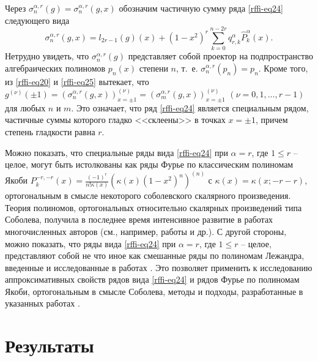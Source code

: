 Через $\sigma_n^{\alpha,r}(g)=\sigma_n^{\alpha,r}(g,x)$ обозначим частичную сумму ряда \eqref{rffi-eq24} следующего вида
\begin{equation}\label{rffi-eq25}
\sigma_n^{\alpha,r}(g,x)=l_{2r-1}(g)(x)+(1-x^2)^r\sum_{k=0}^{n-2r} q_{r,k}^\alpha\hat P_k^\alpha(x).
\end{equation}
Нетрудно увидеть, что $\sigma_n^{\alpha,r}(g)$ представляет собой проектор на подпространство алгебраических полиномов $p_n(x)$ степени $n$, т.~е. $\sigma_n^{\alpha,r}(p_n)=p_n$. Кроме того, из \eqref{rffi-eq20} и \eqref{rffi-eq25} вытекает, что $g^{(\nu)}(\pm1)=(\sigma_n^{\alpha,r}(g,x))^{(\nu)}_{x=\pm1}=(\sigma_m^{\alpha,r}(g,x))^{(\nu)}_{x=\pm1}$ $(\nu=0,1,\ldots, r-1)$ для любых $n$ и $m$. Это означает, что ряд \eqref{rffi-eq24} является специальным рядом, частичные суммы которого гладко <<склеены>>  в точках $x=\pm1$, причем степень гладкости равна $r$.

Можно показать, что специальные ряды вида \eqref{rffi-eq24} при $\alpha=r$, где $1 \le r$ -- целое, могут быть истолкованы как ряды Фурье по классическим полиномам Якоби
$P^{-r,-r}_k(x) = \frac{(-1)^r}{n!\kappa(x)} \left(  \kappa(x)(1-x^2)^n \right)^{(n)}$ с $\kappa(x)=\kappa(x;-r-r)$, ортогональным в смысле некоторого соболевского скалярного произведения. Теория полиномов, ортогональных относительно скалярных произведений типа Соболева, получила в последнее время интенсивное развитие в работах многочисленных авторов (см., например, работы \cite{rffi-35, rffi-36, rffi-37, rffi-38, rffi-39}
и др.). С другой стороны, можно показать, что ряды вида \eqref{rffi-eq24} при $\alpha=r$, где $1 \le r$ -- целое, представляют собой не что иное как смешанные ряды по полиномам Лежандра, введенные и исследованные в работах \cite{rffi-40, rffi-41, rffi-42}.
Это позволяет применить к исследованию аппроксимативных свойств рядов вида \eqref{rffi-eq24} и рядов Фурье по полиномам Якоби, ортогональным в смысле Соболева, методы и подходы, разработанные в указанных работах \cite{rffi-40, rffi-41, rffi-42}.





\section{Результаты}

